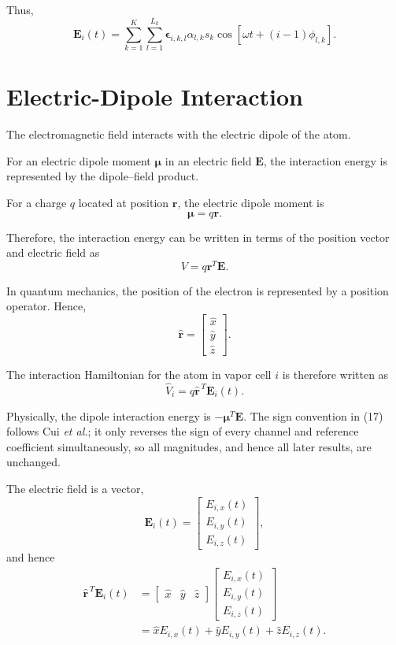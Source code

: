 \documentclass[12pt,a4paper]{article}
\begin{document}
Thus,
\begin{equation}
\boxed{
\mathbf E_i(t)
=
\sum_{k=1}^{K}
\sum_{l=1}^{L_k}
\boldsymbol{\epsilon}_{i,k,l}
\alpha_{l,k}s_k
\cos
\left[
\omega t+(i-1)\phi_{l,k}
\right].
}
\tag{16}
\end{equation}



\section{Electric-Dipole Interaction}

The electromagnetic field interacts with the electric dipole of
the atom.

For an electric dipole moment \(\boldsymbol{\mu}\) in an electric
field \(\mathbf E\), the interaction energy is represented by the
dipole--field product.

For a charge \(q\) located at position \(\mathbf r\), the electric
dipole moment is
\[
\boldsymbol{\mu}
=
q\mathbf r.
\]

Therefore, the interaction energy can be written in terms of the
position vector and electric field as
\[
V
=
q\mathbf r^{T}\mathbf E.
\]

In quantum mechanics, the position of the electron is represented
by a position operator. Hence,
\[
\hat{\mathbf r}
=
\begin{bmatrix}
\hat x\\
\hat y\\
\hat z
\end{bmatrix}.
\]

The interaction Hamiltonian for the atom in vapor cell \(i\) is
therefore written as
\begin{equation}
\boxed{
\hat V_i
=
q\hat{\mathbf r}^{\,T}\mathbf E_i(t).
}
\tag{17}
\end{equation}

Physically, the dipole interaction energy is \(-\boldsymbol{\mu}^{T}\mathbf E\).
The sign convention in (17) follows Cui \emph{et al.}; it only reverses the sign
of every channel and reference coefficient simultaneously, so all magnitudes,
and hence all later results, are unchanged.

The electric field is a vector,
\[
\mathbf E_i(t)
=
\begin{bmatrix}
E_{i,x}(t)\\
E_{i,y}(t)\\
E_{i,z}(t)
\end{bmatrix},
\]
and hence
\[
\begin{aligned}
\hat{\mathbf r}^{\,T}\mathbf E_i(t)
&=
\begin{bmatrix}
\hat x&\hat y&\hat z
\end{bmatrix}
\begin{bmatrix}
E_{i,x}(t)\\
E_{i,y}(t)\\
E_{i,z}(t)
\end{bmatrix}\\
&=
\hat xE_{i,x}(t)
+
\hat yE_{i,y}(t)
+
\hat zE_{i,z}(t).
\end{aligned}
\]
\end{document}

